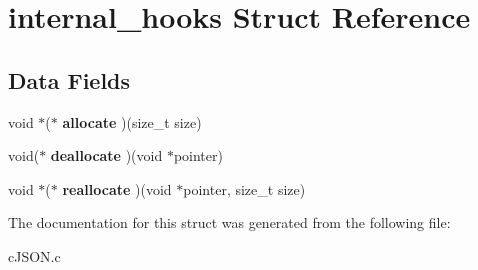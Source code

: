 \hypertarget{structinternal__hooks}{}\section{internal\+\_\+hooks Struct Reference}
\label{structinternal__hooks}
\subsection*{Data Fields}
\begin{DoxyCompactItemize}
\item 
\mbox{\label{structinternal__hooks_a4f765ac1a0e1e3f58d49c7abd211e0da}} 
void $\ast$($\ast$ {\bfseries allocate} )(size\+\_\+t size)
\item 
\mbox{\label{structinternal__hooks_a887c93b3f394f367ecfe7f839d35ca1e}} 
void($\ast$ {\bfseries deallocate} )(void $\ast$pointer)
\item 
\mbox{\label{structinternal__hooks_acb4baff89e1b2e26de89cd4cdd69c2b3}} 
void $\ast$($\ast$ {\bfseries reallocate} )(void $\ast$pointer, size\+\_\+t size)
\end{DoxyCompactItemize}


The documentation for this struct was generated from the following file\+:\begin{DoxyCompactItemize}
\item 
c\+J\+S\+O\+N.\+c\end{DoxyCompactItemize}
